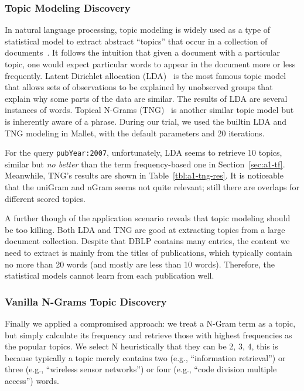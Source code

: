 \subsubsection{Topic Modeling Discovery}
In natural language processing, topic modeling is widely used as a type of statistical model to extract abstract ``topics'' that occur in a collection of documents~\cite{topic_model}. It follows the intuition that given a document with a particular topic, one would expect particular words to appear in the document more or less frequently. Latent Dirichlet allocation (LDA)~\cite{paper_lda} is the most famous topic model that allows sets of observations to be explained by unobserved groups that explain why some parts of the data are similar. The results of LDA are several instances of words. Topical N-Grams (TNG)~\cite{paper_tng} is another similar topic model but is inherently aware of a phrase. During our trial, we used the builtin LDA and TNG modeling in Mallet, with the default parameters and 20 iterations.

For the query \verb|pubYear:2007|, unfortunately, LDA seems to retrieve 10 topics, similar but \textit{no better} than the term frequency-based one in Section~\ref{sec:a1-tf}. Meanwhile, TNG's results are shown in Table~\ref{tbl:a1-tng-res}. It is noticeable that the \textsf{uniGram} and \textsf{nGram} seems not quite relevant; still there are overlaps for different scored topics.

A further though of the application scenario reveals that topic modeling should be too killing. Both LDA and TNG are good at extracting topics from a large document collection. Despite that DBLP contains many entries, the content we need to extract is mainly from the titles of publications, which typically contain no more than 20 words (and mostly are less than 10 words). Therefore, the statistical models cannot learn from each publication well.

\subsubsection{Vanilla N-Grams Topic Discovery}
Finally we applied a compromised approach: we treat a N-Gram term as a topic, but simply calculate its frequency and retrieve those with highest frequencies as the popular topics. We select N heuristically that they can be 2, 3, 4, this is because typically a topic merely contains two (e.g., ``information retrieval'') or three (e.g., ``wireless sensor networks'') or four (e.g., ``code division multiple access'') words.

